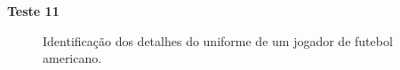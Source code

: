 \textbf{Teste 11}\\
\begin{figure}
    \centering
    \caption{Identificação dos detalhes do uniforme de um jogador de futebol americano.}
\end{figure}